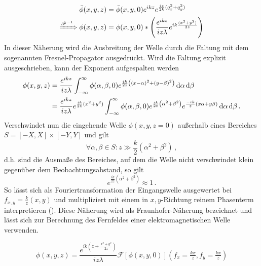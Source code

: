 \begin{align}
	\bar{\phi}(x,y, z) &=\bar{\phi}(x,y,0) e^{ik z}e^{\frac{i z}{2k}(q_x^2+q_y^2)} 
	\label{eq:fresnel_fourier}\\
	\xRightarrow{\mathscr{F}^{-1}}  \phi(x,y, z) &=\phi(x,y,0) \ast \left( \frac{e^{ik z}}{i z \lambda } e^{ik\frac{(x^2+y^2)}{2 z}} \right)
	\label{eq:fresnel_real}
\end{align}
In dieser Näherung wird die Ausbreitung der Welle durch die Faltung mit dem sogenannten Fresnel-Propagator ausgedrückt. Wird die Faltung explizit ausgeschrieben, kann der Exponent aufgespalten werden
\begin{align}
\label{eq:fresnel_explizit}
	\phi(x,y, z) & =\frac{e^{ikz}}{iz\lambda}                           
	\int_{-\infty}^\infty 
	\phi(\alpha,\beta,0)
	e^{\frac{ik}{2z}\left(\left(x-\alpha\right)^2+\left(y-\beta\right)^2\right)}
	\dif \alpha \dif \beta \nonumber \\
	             & =\frac{e^{ikz}}{iz\lambda}e^{\frac{ik}{2z}(x^2+y^2)} 
	\int_{-\infty}^\infty 
	\phi(\alpha,\beta,0)
	e^{\frac{ik}{2z}\left(\alpha^2+\beta^2\right)}
	e^{\frac{-ik}{ z}\left(x\alpha+y\beta\right)}
	\dif \alpha \dif \beta \,.
\end{align}
Verschwindet nun die eingehende Welle $\phi(x,y,z=0)$ außerhalb eines Bereiches $S=[-X,X]\times[-Y,Y]$ und gilt 
\begin{equation}
	\forall \alpha,\beta \in S:	z\gg \frac{k}{2}\left(\alpha^2+\beta^2\right) \, , 
\end{equation}
d.h. sind die Ausmaße des Bereiches, auf dem die Welle nicht verschwindet klein gegenüber dem Beobachtungsabstand, so gilt
\begin{equation}
	e^{\frac{ik}{2z}\left(\alpha^2+\beta^2\right)}\approx 1 \,.
\end{equation}
So lässt sich  als Fouriertransformation der Eingangswelle ausgewertet bei $f_{x,y}=\tfrac{k}{z}(x,y)$ und multipliziert mit einem in $x,y$-Richtung reinem Phasenterm interpretieren (). Diese Näherung wird als Fraunhofer-Näherung bezeichnet und lässt sich zur Berechnung des Fernfeldes einer elektromagnetischen Welle verwenden.

\begin{equation}
\label{eq:fraunhofer}
	\phi(x,y,z)=\frac{e^{ik(z+\frac{x^2+y^2}{2z})}}{iz\lambda}\mathscr{F}\left[\phi(x,y,0)\right](f_x=\tfrac{kx}{z},f_y=\tfrac{kx}{z})
\end{equation}


